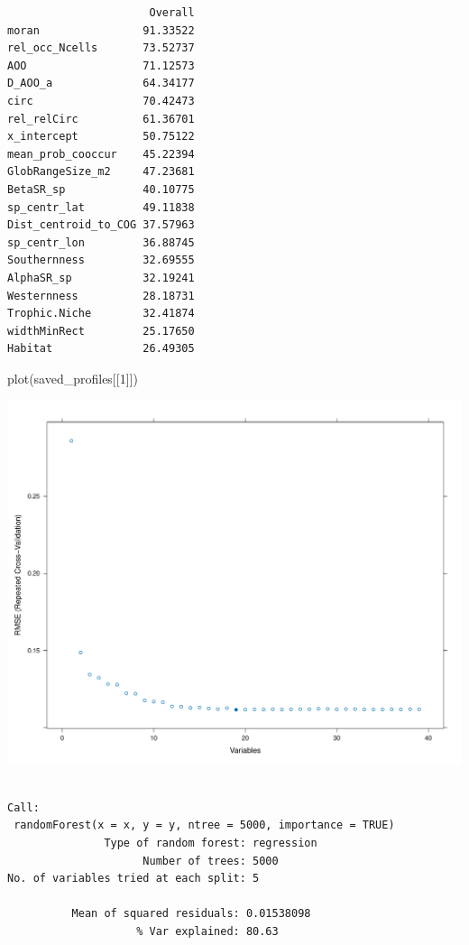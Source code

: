 \documentclass[
  letterpaper,
  DIV=11,
  numbers=noendperiod]{scrreprt}
\newenvironment{Shaded}{\begin{snugshade}}{\end{snugshade}}
\newcommand{\DecValTok}[1]{\textcolor[rgb]{0.68,0.00,0.00}{#1}}
\newcommand{\FunctionTok}[1]{\textcolor[rgb]{0.28,0.35,0.67}{#1}}
\newcommand{\NormalTok}[1]{\textcolor[rgb]{0.00,0.23,0.31}{#1}}
\newcommand{\SpecialCharTok}[1]{\textcolor[rgb]{0.37,0.37,0.37}{#1}}
\begin{document}
\begin{verbatim}
                      Overall
moran                91.33522
rel_occ_Ncells       73.52737
AOO                  71.12573
D_AOO_a              64.34177
circ                 70.42473
rel_relCirc          61.36701
x_intercept          50.75122
mean_prob_cooccur    45.22394
GlobRangeSize_m2     47.23681
BetaSR_sp            40.10775
sp_centr_lat         49.11838
Dist_centroid_to_COG 37.57963
sp_centr_lon         36.88745
Southernness         32.69555
AlphaSR_sp           32.19241
Westernness          28.18731
Trophic.Niche        32.41874
widthMinRect         25.17650
Habitat              26.49305
\end{verbatim}

\begin{Shaded}
\begin{Highlighting}[]
\FunctionTok{plot}\NormalTok{(saved\_profiles[[}\DecValTok{1}\NormalTok{]])}
\end{Highlighting}
\end{Shaded}

\includegraphics{02_rfe_files/figure-pdf/rfe-results-boxplot-j-1.pdf}

\begin{Shaded}
\end{Shaded}

\begin{verbatim}

Call:
 randomForest(x = x, y = y, ntree = 5000, importance = TRUE) 
               Type of random forest: regression
                     Number of trees: 5000
No. of variables tried at each split: 5

          Mean of squared residuals: 0.01538098
                    % Var explained: 80.63
\end{verbatim}
\end{document}
